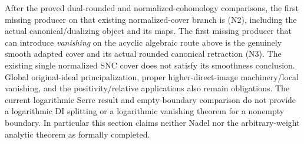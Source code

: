 After the proved dual-rounded and normalized-cohomology comparisons,
the first missing producer on that existing normalized-cover branch
is (N2), including the actual canonical/dualizing object and its maps.
The first missing producer that can introduce \emph{vanishing} on the
acyclic algebraic route above is the genuinely smooth adapted cover
and its actual rounded canonical retraction (N3).  The existing single
normalized SNC cover does not satisfy its smoothness conclusion.
Global original-ideal principalization, proper higher-direct-image
machinery/local vanishing, and the positivity/relative applications
also remain obligations.  The current logarithmic Serre result and
empty-boundary comparison do not provide a logarithmic DI splitting
or a logarithmic vanishing theorem for a nonempty boundary.  In
particular this section claims neither Nadel nor the arbitrary-weight
analytic theorem as formally completed.
